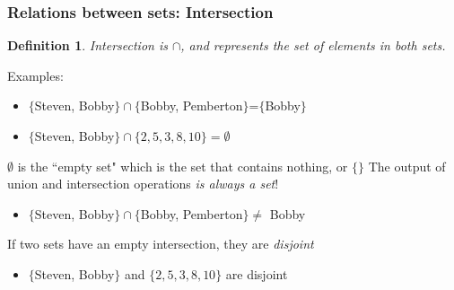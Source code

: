 \documentclass[aspectratio=169]{beamer}
\newtheorem{defn}{Definition}
\numberwithin{equation}{section}
\begin{document}
\begin{frame}
\frametitle{Relations between sets: Intersection}

\begin{defn}
Intersection is $\cap$, and represents the set of elements in \textit{both} sets.
\end{defn}
\pause

{Examples: }
\begin{itemize}
\item $\{$Steven, Bobby$\} \cap \{$Bobby, Pemberton$\}$=$\{$Bobby$\}$ \pause
\item $\{$Steven, Bobby$\} \cap \{2, 5, 3, 8, 10\}=\emptyset$ \pause
\end{itemize}

$\emptyset$ is the ``empty set" which is the set that contains nothing, or $\{\}$ 
The output of union and intersection operations \textit{is always a set}! \pause

\begin{itemize}
\item $\{$Steven, Bobby$\} \cap \{$Bobby, Pemberton$\} \not=$ Bobby \pause
\end{itemize}

If two sets have an empty intersection, they are \textit{disjoint} \pause

\begin{itemize}
\item $\{$Steven, Bobby$\}$ and $  \{2, 5, 3, 8, 10\}$ are disjoint
\end{itemize}

\end{frame}
\end{document}
